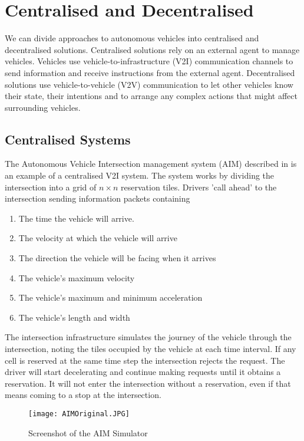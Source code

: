 \section{Centralised and Decentralised}
\label{sec:Centralised and Decentralised}

We can divide approaches to autonomous vehicles into centralised and decentralised solutions. Centralised solutions rely on an external agent to manage vehicles. Vehicles use vehicle-to-infrastructure (V2I) communication channels to send information and receive instructions from the external agent. Decentralised solutions use vehicle-to-vehicle (V2V) communication to let other vehicles know their state, their intentions and to arrange any complex actions that might affect surrounding vehicles.

\subsection{Centralised Systems}
\label{subsec:Centralised Systems}
The Autonomous Vehicle Intersection management system (AIM) described in \citep{Dresner2004} is an example of a centralised V2I system. The system works by dividing the intersection into a grid of $n \times n$ reservation tiles. Drivers 'call ahead' to the intersection sending information packets containing

\begin{enumerate}
\item The time the vehicle will arrive.
\item The velocity at which the vehicle will arrive
\item The direction the vehicle will be facing when it arrives
\item The vehicle's maximum velocity
\item The vehicle's maximum and minimum acceleration
\item The vehicle's length and width
\end{enumerate}

The intersection infrastructure simulates the journey of the vehicle through the intersection, noting the tiles occupied by the vehicle at each time interval. If any cell is reserved at the same time step the intersection rejects the request. The driver will start decelerating and continue making requests until it obtains a reservation. It will not enter the intersection without a reservation, even if that means coming to a stop at the intersection.

\begin{figure}[htb]
\texttt{[image: AIMOriginal.JPG]}
\caption{Screenshot of the AIM Simulator}
\end{figure}

